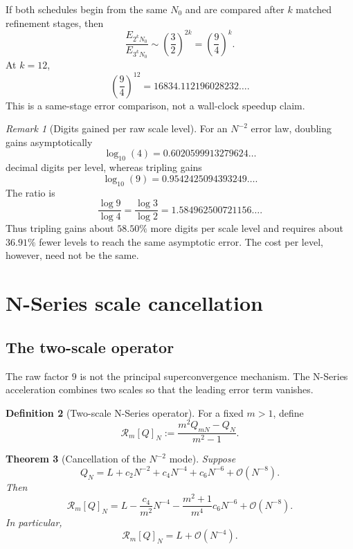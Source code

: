 \documentclass[12pt]{article}
\newtheorem{theorem}{Theorem}[section]
\theoremstyle{definition}
\newtheorem{definition}[theorem]{Definition}
\theoremstyle{remark}
\newtheorem{remark}[theorem]{Remark}
\newcommand{\Rop}{\mathcal{R}}
\newcommand{\Order}{\mathcal{O}}
\begin{document}
If both schedules begin from the same $N_0$ and are compared after $k$ matched
refinement stages, then
\begin{equation}
  \frac{E_{2^kN_0}}{E_{3^kN_0}}
  \sim\left(\frac{3}{2}\right)^{2k}
  =\left(\frac94\right)^k.
  \label{eq:same-stage-ratio}
\end{equation}
At $k=12$,
\[
  \left(\frac94\right)^{12}
  =16834.112196028232\ldots.
\]
This is a same-stage error comparison, not a wall-clock speedup claim.

\begin{remark}[Digits gained per raw scale level]
For an $N^{-2}$ error law, doubling gains asymptotically
\[
  \log_{10}(4)=0.6020599913279624\ldots
\]
decimal digits per level, whereas tripling gains
\[
  \log_{10}(9)=0.9542425094393249\ldots.
\]
The ratio is
\[
  \frac{\log 9}{\log 4}
  =\frac{\log 3}{\log 2}
  =1.584962500721156\ldots.
\]
Thus tripling gains about $58.50\%$ more digits per scale level and requires
about $36.91\%$ fewer levels to reach the same asymptotic error.  The cost per
level, however, need not be the same.
\end{remark}

\section{N-Series scale cancellation}

\subsection{The two-scale operator}

The raw factor $9$ is not the principal superconvergence mechanism.  The
N-Series acceleration combines two scales so that the leading error term
vanishes.

\begin{definition}[Two-scale N-Series operator]
For a fixed $m>1$, define
\begin{equation}
  \Rop_m[Q]_N
  :=\frac{m^2Q_{mN}-Q_N}{m^2-1}.
  \label{eq:Rop}
\end{equation}
\end{definition}

\begin{theorem}[Cancellation of the $N^{-2}$ mode]
Suppose
\begin{equation}
  Q_N=L+c_2N^{-2}+c_4N^{-4}+c_6N^{-6}+\Order(N^{-8}).
  \label{eq:general-even-expansion}
\end{equation}
Then
\begin{equation}
  \Rop_m[Q]_N
  =L-\frac{c_4}{m^2}N^{-4}
    -\frac{m^2+1}{m^4}c_6N^{-6}
    +\Order(N^{-8}).
  \label{eq:Rop-expansion}
\end{equation}
In particular,
\[
  \Rop_m[Q]_N=L+\Order(N^{-4}).
\]
\end{theorem}
\end{document}
